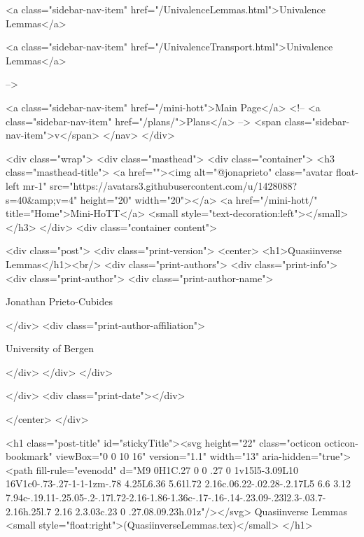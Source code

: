       
    
      
        
          <a class="sidebar-nav-item" href="/UnivalenceLemmas.html">Univalence Lemmas</a>
        
      
    
      
        
          <a class="sidebar-nav-item" href="/UnivalenceTransport.html">Univalence Lemmas</a>
        
      
     -->

    <a class="sidebar-nav-item" href="/mini-hott">Main Page</a>
    <!-- <a class="sidebar-nav-item" href="/plans/">Plans</a> -->
    <span class="sidebar-nav-item">v</span>
  </nav>
</div>

    <div class="wrap">
      <div class="masthead">
        <div class="container">
          <h3 class="masthead-title">
            <a href=""><img alt="@jonaprieto" class="avatar float-left mr-1" src="https://avatars3.githubusercontent.com/u/1428088?s=40&amp;v=4" height="20" width="20"></a>
            <a href="/mini-hott/" title="Home">Mini-HoTT</a>
            <small style="text-decoration:left"></small>
          </h3>
        </div>
      <div class="container content">
        







<div class="post">
  <div class="print-version">
    <center>
      <h1>Quasiinverse Lemmas</h1><br/>
        <div class="print-authors">
          <div class="print-info">
            <div class="print-author">
              <div class="print-author-name">
                
                  Jonathan Prieto-Cubides
                
              </div>
              <div class="print-author-affiliation">
                
                  University of Bergen
                
                </div>
            </div>
          </div>
          
          
        </div>
        <div class="print-date"></div>
        
        
    </center>
  </div>

  

  <h1 class="post-title" id="stickyTitle"><svg height="22" class="octicon octicon-bookmark" viewBox="0 0 10 16" version="1.1" width="13" aria-hidden="true"><path fill-rule="evenodd" d="M9 0H1C.27 0 0 .27 0 1v15l5-3.09L10 16V1c0-.73-.27-1-1-1zm-.78 4.25L6.36 5.61l.72 2.16c.06.22-.02.28-.2.17L5 6.6 3.12 7.94c-.19.11-.25.05-.2-.17l.72-2.16-1.86-1.36c-.17-.16-.14-.23.09-.23l2.3-.03.7-2.16h.25l.7 2.16 2.3.03c.23 0 .27.08.09.23h.01z"/></svg> Quasiinverse Lemmas <small style="float:right">(QuasiinverseLemmas.tex)</small>
  </h1>

